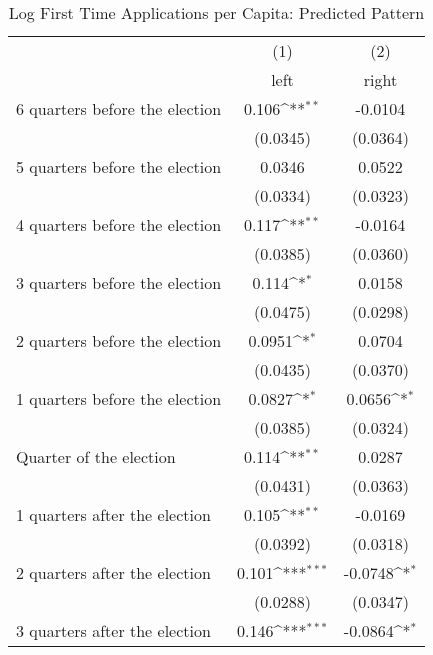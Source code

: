 \begin{table}[htbp]\centering
\def\sym#1{\ifmmode^{#1}\else\(^{#1}\)\fi}
\caption{Log First Time Applications per Capita: Predicted Pattern}
\begin{tabular}{l*{2}{c}}
\hline\hline
                    &\multicolumn{1}{c}{(1)}&\multicolumn{1}{c}{(2)}\\
                    &\multicolumn{1}{c}{left}&\multicolumn{1}{c}{right}\\
\hline
 6 quarters before the election&       0.106\sym{**} &     -0.0104         \\
                    &    (0.0345)         &    (0.0364)         \\
[1em]
 5 quarters before the election&      0.0346         &      0.0522         \\
                    &    (0.0334)         &    (0.0323)         \\
[1em]
 4 quarters before the election&       0.117\sym{**} &     -0.0164         \\
                    &    (0.0385)         &    (0.0360)         \\
[1em]
 3 quarters before the election&       0.114\sym{*}  &      0.0158         \\
                    &    (0.0475)         &    (0.0298)         \\
[1em]
 2 quarters before the election&      0.0951\sym{*}  &      0.0704         \\
                    &    (0.0435)         &    (0.0370)         \\
[1em]
 1 quarters before the election&      0.0827\sym{*}  &      0.0656\sym{*}  \\
                    &    (0.0385)         &    (0.0324)         \\
[1em]
Quarter of the election&       0.114\sym{**} &      0.0287         \\
                    &    (0.0431)         &    (0.0363)         \\
[1em]
 1 quarters after the election&       0.105\sym{**} &     -0.0169         \\
                    &    (0.0392)         &    (0.0318)         \\
[1em]
 2 quarters after the election&       0.101\sym{***}&     -0.0748\sym{*}  \\
                    &    (0.0288)         &    (0.0347)         \\
[1em]
 3 quarters after the election&       0.146\sym{***}&     -0.0864\sym{*}  \\

\end{tabular}
\end{table}
